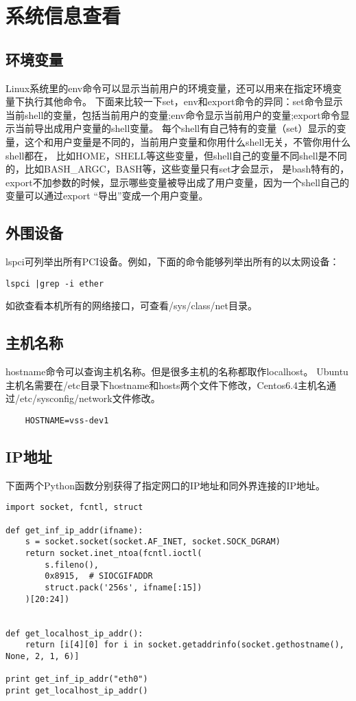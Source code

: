 \section{系统信息查看}

\subsection{环境变量}
Linux系统里的env命令可以显示当前用户的环境变量，还可以用来在指定环境变量下执行其他命令。
下面来比较一下set，env和export命令的异同：set命令显示当前shell的变量，包括当前用户的变量;env命令显示当前用户的变量;export命令显示当前导出成用户变量的shell变量。
每个shell有自己特有的变量（set）显示的变量，这个和用户变量是不同的，当前用户变量和你用什么shell无关，不管你用什么shell都在，
比如HOME，SHELL等这些变量，但shell自己的变量不同shell是不同的，比如BASH\_ARGC，BASH等，这些变量只有set才会显示，
是bash特有的，export不加参数的时候，显示哪些变量被导出成了用户变量，因为一个shell自己的变量可以通过export “导出”变成一个用户变量。

\subsection{外围设备}
lspci可列举出所有PCI设备。例如，下面的命令能够列举出所有的以太网设备：
\begin{verbatim}
lspci |grep -i ether
\end{verbatim}

如欲查看本机所有的网络接口，可查看/sys/class/net目录。



\subsection{主机名称}
hostname命令可以查询主机名称。但是很多主机的名称都取作localhost。
Ubuntu主机名需要在/etc目录下hostname和hosts两个文件下修改，Centos6.4主机名通过/etc/sysconfig/network文件修改。

\begin{lstlisting}
	HOSTNAME=vss-dev1   
\end{lstlisting}


\subsection{IP地址}

下面两个Python函数分别获得了指定网口的IP地址和同外界连接的IP地址。
\begin{verbatim}
import socket, fcntl, struct
 
def get_inf_ip_addr(ifname):
    s = socket.socket(socket.AF_INET, socket.SOCK_DGRAM)
    return socket.inet_ntoa(fcntl.ioctl(
        s.fileno(),
        0x8915,  # SIOCGIFADDR
        struct.pack('256s', ifname[:15])
    )[20:24])
    

def get_localhost_ip_addr():
    return [i[4][0] for i in socket.getaddrinfo(socket.gethostname(), None, 2, 1, 6)]

print get_inf_ip_addr("eth0")
print get_localhost_ip_addr()

\end{verbatim}


